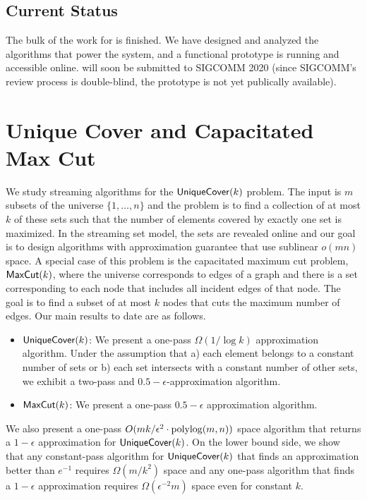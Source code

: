 \subsection*{Current Status}
The bulk of the work for \sysname{} is finished.  We have designed and analyzed the algorithms that power the system, and a functional prototype is running and accessible online.  \sysname{} will soon be submitted to SIGCOMM 2020 (since SIGCOMM's review process is double-blind, the prototype is not yet  publically available).

\section{Unique Cover and Capacitated Max Cut}
\label{sec:uc}

We study streaming algorithms for the $\uc(k)$ problem. 
The input is $m$ subsets of the universe $\{1,\ldots,n\}$ and the problem is to find a collection of at most $k$ of these sets such that the number of elements covered by exactly one set is maximized. In the streaming set model, the sets are revealed online and our goal is to design algorithms with approximation guarantee that use sublinear $o(mn)$ space. A special case of this problem is the capacitated maximum cut problem, $\maxcut(k)$, where the universe corresponds to edges of a graph and there is a set corresponding to each node that includes all incident edges of that node. The goal is to find a subset of at most $k$ nodes that cuts the maximum number of edges. 
Our main results to date are as follows.%
\begin{itemize}
\item $\uc(k)$: We present a one-pass $\Omega(1/\log k)$ approximation algorithm. Under the assumption that a) each element belongs to a constant number of sets or b) each set intersects with a constant number of other sets, we exhibit a two-pass and $0.5-\epsilon$-approximation algorithm.  
\item $\maxcut(k)$: We present a one-pass $0.5-\epsilon$ approximation algorithm.
\end{itemize} 
We also present a one-pass $O(mk/\epsilon^{2} \cdot \operatorname{polylog}(m,n))$ space algorithm that returns a $1-\epsilon$ approximation for $\uc(k)$. On the lower bound side, we show that any constant-pass algorithm for $\uc(k)$ that finds an approximation better than $e^{-1}$ requires $\Omega(m/k^2)$ space and any one-pass algorithm that finds a $1-\epsilon$ approximation requires $\Omega(\epsilon^{-2} m)$ space even for constant $k$.

